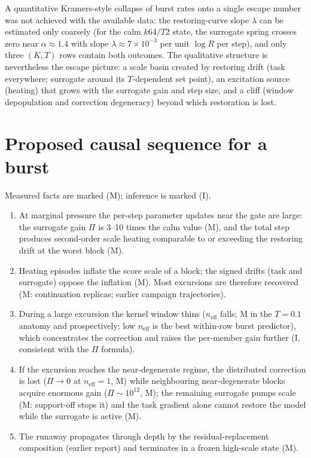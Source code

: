 \documentclass[11pt,a4paper]{article}
\newcommand{\neff}{n_{\mathrm{eff}}}
\newcommand{\Pisurr}{\Pi}
\begin{document}
A quantitative Kramers-style collapse of burst rates onto a single escape
number was not achieved with the available data: the restoring-curve slope
\(\lambda\) can be estimated only coarsely (for the calm \(k64/T2\) state,
the surrogate spring crosses zero near \(\alpha \approx 1.4\) with slope
\(\lambda \approx 7\times10^{-3}\) per unit \(\log R\) per step), and only
three \((K,T)\) rows contain both outcomes. The qualitative structure is
nevertheless the escape picture: a scale basin created by restoring drift
(task everywhere; surrogate around its \(T\)-dependent set point), an
excitation source (heating) that grows with the surrogate gain and step
size, and a cliff (window depopulation and correction degeneracy) beyond
which restoration is lost.

\section{Proposed causal sequence for a burst}

Measured facts are marked (M); inference is marked (I).

\begin{enumerate}[leftmargin=1.6em]
\item At marginal pressure the per-step parameter updates near the gate are
large: the surrogate gain \(\Pisurr\) is 3--10 times the calm value (M),
and the total step produces second-order scale heating comparable to or
exceeding the restoring drift at the worst block (M).
\item Heating episodes inflate the score scale of a block; the signed
drifts (task and surrogate) oppose the inflation (M). Most excursions are
therefore recovered (M: continuation replicas; earlier campaign
trajectories).
\item During a large excursion the kernel window thins
(\(\neff\) falls; M in the \(T{=}0.1\) anatomy and prospectively:
low \(\neff\) is the best within-row burst predictor), which concentrates
the correction and raises the per-member gain further (I, consistent with
the \(\Pisurr\) formula).
\item If the excursion reaches the near-degenerate regime, the distributed
correction is lost (\(\Pisurr \to 0\) at \(\neff = 1\), M) while
neighbouring near-degenerate blocks acquire enormous gain
(\(\Pisurr \sim 10^{12}\), M); the remaining surrogate pumps scale
(M: support-off stops it) and the task gradient alone cannot restore the
model while the surrogate is active (M).
\item The runaway propagates through depth by the residual-replacement
composition (earlier report) and terminates in a frozen high-scale state
(M).
\end{enumerate}
\end{document}
